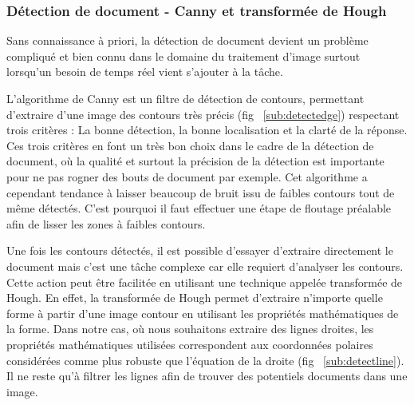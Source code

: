 \subsubsection{Détection de document - Canny et transformée de Hough}
\label{subsubsec:cannyhough} 
Sans connaissance à priori, la détection de document devient un problème compliqué et bien connu dans le domaine du traitement d'image surtout lorsqu'un besoin de temps réel vient s'ajouter à la tâche.

L'algorithme de Canny\cite{Canny86acomputational} est un filtre de détection de contours, permettant d'extraire d'une image des contours très précis (fig ~\ref{sub:detectedge}) respectant trois critères : La bonne détection, la bonne localisation et la clarté de la réponse. Ces trois critères en font un très bon choix dans le cadre de la détection de document, où la qualité et surtout la précision de la détection est importante pour ne pas rogner des bouts de document par exemple. Cet algorithme a cependant tendance à laisser beaucoup de bruit issu de faibles contours tout de même détectés. C'est pourquoi il faut effectuer une étape de floutage préalable afin de lisser les zones à faibles contours.

Une fois les contours détectés, il est possible d'essayer d'extraire directement le document mais c'est une tâche complexe car elle requiert d'analyser les contours. Cette action peut être facilitée en utilisant une technique appelée transformée de Hough\cite{hough}. En effet, la transformée de Hough permet d'extraire n'importe quelle forme à partir d'une image contour en utilisant les propriétés mathématiques de la forme. Dans notre cas, où nous souhaitons extraire des lignes droites, les propriétés mathématiques utilisées correspondent aux coordonnées polaires considérées comme plus robuste que l’équation de la droite (fig ~\ref{sub:detectline}). Il ne reste qu'à filtrer les lignes afin de trouver des potentiels documents dans une image.

